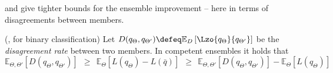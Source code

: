 \documentclass[../main.tex]{subfiles}
\begin{document}
 and give tighter bounds for the ensemble improvement -- here in terms of disagreements between members.
\begin{theorem} (\cite{theisen}, for binary classification) Let $D(q_{\Theta}, q_{\Theta'}) \defeq \mathbb{E}_{D}\left[ \Lzo{q_{\Theta}}{q_{\Theta'}} \right]$ be the \textit{disagreement rate} between two members. In competent ensembles it holds that
$$
\mathbb{E}_{\Theta, \Theta'}\left[ D(q_{\Theta}, q_{\Theta'}) \right] 
~ ~  \geq ~ ~ 
\mathbb{E}_{\Theta}\left[ L(q_{\Theta}) - L(\bar{q}) \right] 
~ ~  \geq ~ ~ 
\mathbb{E}_{\Theta, \Theta'}\left[ D(q_{\Theta}, q_{\Theta'}) \right] - \mathbb{E}_{\Theta}\left[ L(q_{\Theta}) \right]  
$$
\end{theorem}




\end{document}
